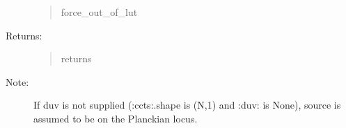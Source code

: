 \documentclass[letterpaper,10pt,english]{sphinxmanual}
\begin{document}
\begin{fulllineitems}
\begin{description}
\begin{quote}
\begin{description}
\item[{force\_out\_of\_lut}] \leavevmode
{}

\end{description}\end{quote}

\item[{Returns:}] \leavevmode\begin{quote}\begin{description}
\item[{returns}] \leavevmode
{}

\end{description}\end{quote}

\item[{Note:}] \leavevmode
If duv is not supplied (:ccts:.shape is (N,1) and :duv: is None), 
source is assumed to be on the Planckian locus.

\end{description}

\end{fulllineitems}

\end{document}

